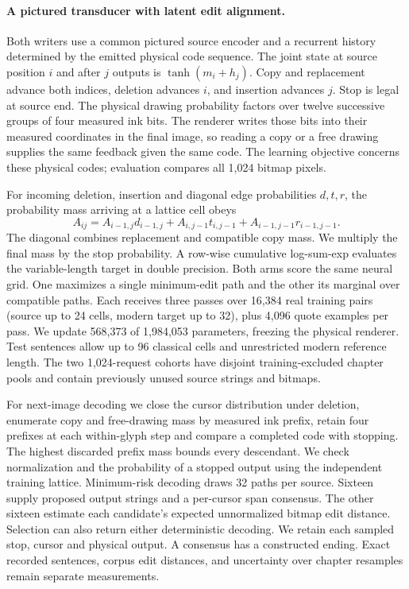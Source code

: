 \paragraph{A pictured transducer with latent edit alignment.}
Both writers use a common pictured source encoder and a recurrent history determined by the emitted physical code sequence. The joint state at source position $i$ and after $j$ outputs is $\tanh(m_i+h_j)$. Copy and replacement advance both indices, deletion advances $i$, and insertion advances $j$. Stop is legal at source end. The physical drawing probability factors over twelve successive groups of four measured ink bits. The renderer writes those bits into their measured coordinates in the final image, so reading a copy or a free drawing supplies the same feedback given the same code. The learning objective concerns these physical codes; evaluation compares all 1,024 bitmap pixels.

For incoming deletion, insertion and diagonal edge probabilities $d,t,r$, the probability mass arriving at a lattice cell obeys
\[
 A_{ij}=A_{i-1,j}d_{i-1,j}+A_{i,j-1}t_{i,j-1}+A_{i-1,j-1}r_{i-1,j-1}.
\]
The diagonal combines replacement and compatible copy mass. We multiply the final mass by the stop probability. A row-wise cumulative log-sum-exp evaluates the variable-length target in double precision. Both arms score the same neural grid. One maximizes a single minimum-edit path and the other its marginal over compatible paths. Each receives three passes over 16,384 real training pairs (source up to 24 cells, modern target up to 32), plus 4,096 quote examples per pass. We update 568,373 of 1,984,053 parameters, freezing the physical renderer. Test sentences allow up to 96 classical cells and unrestricted modern reference length. The two 1,024-request cohorts have disjoint training-excluded chapter pools and contain previously unused source strings and bitmaps.

For next-image decoding we close the cursor distribution under deletion, enumerate copy and free-drawing mass by measured ink prefix, retain four prefixes at each within-glyph step and compare a completed code with stopping. The highest discarded prefix mass bounds every descendant. We check normalization and the probability of a stopped output using the independent training lattice. Minimum-risk decoding draws 32 paths per source. Sixteen supply proposed output strings and a per-cursor span consensus. The other sixteen estimate each candidate's expected unnormalized bitmap edit distance. Selection can also return either deterministic decoding. We retain each sampled stop, cursor and physical output. A consensus has a constructed ending. Exact recorded sentences, corpus edit distances, and uncertainty over chapter resamples remain separate measurements.

